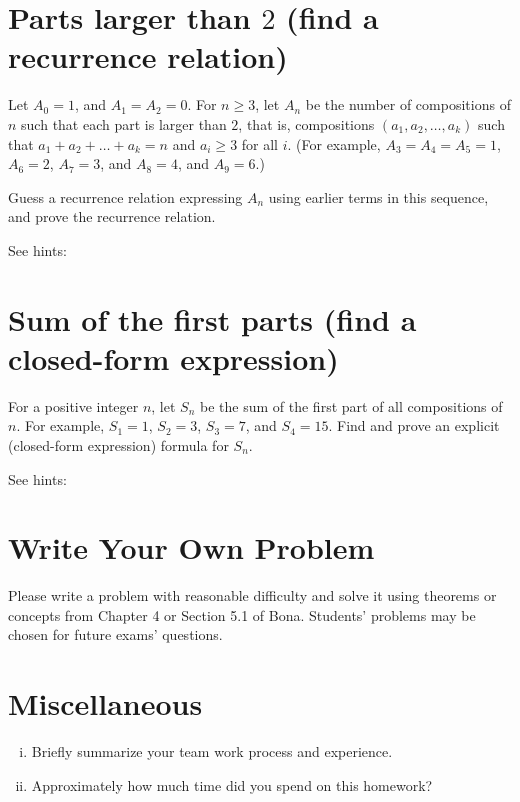 \documentclass[12pt]{amsart}
\begin{document}
\section{Parts larger than $2$ (find a recurrence relation)}
Let $A_0=1$, and $A_1=A_2=0$.
For $n \geq 3$, let $A_n$ be the number of compositions of $n$ such that each part is larger than $2$, that is, compositions $(a_1, a_2, \dots, a_k)$ such that $a_1+a_2+ \dots + a_k = n$ and $a_i \geq 3$ for all $i$. 
(For example, $A_3=A_4=A_5=1$, $A_6=2$, $A_7=3$, and $A_8=4$, and $A_9=6$.) 

Guess a recurrence relation expressing $A_n$ using earlier terms in this sequence, and prove the recurrence relation. 


\noindent See hints:






\section{Sum of the first parts (find a closed-form expression)}
For a positive integer $n$, let $S_n$ be the sum of the first part of all compositions of $n$.
For example, $S_1=1$, $S_2=3$, $S_3=7$, and $S_4=15$.
Find and prove an explicit (closed-form expression) formula for $S_n$. 

See hints:




\section{Write Your Own Problem}\label{sec:write_your_own}
Please write a problem with reasonable difficulty and solve it using theorems or concepts from Chapter 4 or Section 5.1 of Bona. Students' problems may be chosen for future exams' questions. 


\section{Miscellaneous}
\begin{enumerate}[i.]
    \item Briefly summarize your team work process and experience. 
    \item Approximately how much time did you spend on this homework?
\end{enumerate}
\end{document}
